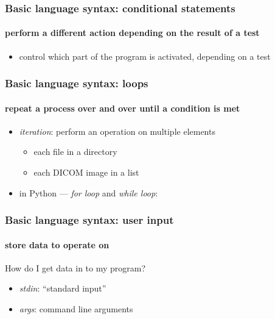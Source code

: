 \documentclass{beamer}
\begin{document}
    \begin{frame}
	    \frametitle{Basic language syntax: conditional statements}
	    \framesubtitle{perform a different action depending on the result of a test}
	    \begin{itemize}
		    \item control which part of the program is activated, depending on a test 
	    \end{itemize}
	    \lstI

    \end{frame}



    \begin{frame}
	    \frametitle{Basic language syntax: loops}
	    \framesubtitle{repeat a process over and over until a condition is met}
	    \begin{itemize}
		    \item \textit{iteration}: perform an operation on multiple elements
			    \begin{itemize}
				    \item each file in a directory
				    \item each DICOM image in a list
			    \end{itemize}
		    \item in Python --- \textit{for loop} and \textit{while loop}:
	    \end{itemize}
	    \lstJ
    \end{frame}




    \begin{frame}
	    \frametitle{Basic language syntax: user input}
	    \framesubtitle{store data to operate on}
	    How do I get data in to my program?
	    \begin{itemize}
		    \item \textit{stdin}: ``standard input''
		    \item \textit{args}: command line arguments
	    \end{itemize}
	   \lstK
    \end{frame}
\end{document}
